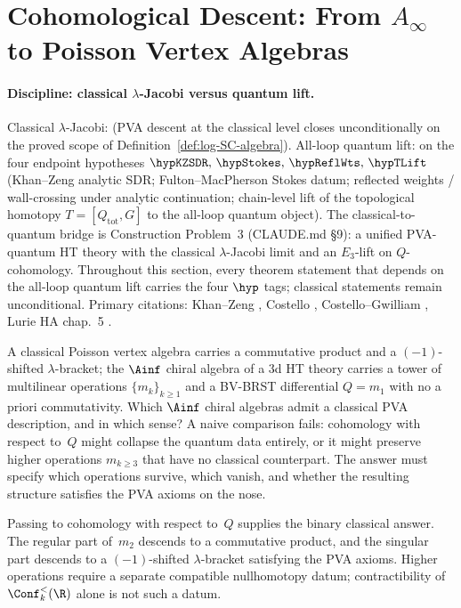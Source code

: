 \section{Cohomological Descent: From $A_\infty$ to Poisson Vertex Algebras}

\paragraph{Discipline: classical $\lambda$-Jacobi versus quantum lift.}
Classical $\lambda$-Jacobi: \ClaimStatusProvedHere{} (PVA descent at the
classical level closes unconditionally on the proved scope of
Definition~\ref{def:log-SC-algebra}). All-loop quantum lift:
\ClaimStatusConditional{} on the four endpoint hypotheses
$\hypKZSDR,\,\hypStokes,\,\hypReflWts,\,\hypTLift$
(Khan--Zeng analytic SDR; Fulton--MacPherson Stokes datum;
reflected weights / wall-crossing under analytic continuation;
chain-level lift of the topological homotopy
$T = [Q_{\mathrm{tot}}, G]$ to the all-loop quantum object).
The classical-to-quantum bridge is
Construction Problem~3 (CLAUDE.md \S9): a unified PVA-quantum HT theory
with the classical $\lambda$-Jacobi limit and an $E_3$-lift on
$Q$-cohomology. Throughout this section, every theorem statement that
depends on the all-loop quantum lift carries the four $\hyp$ tags;
classical statements remain unconditional. Primary citations:
Khan--Zeng \cite{KZ25}, Costello \cite{Costello2011Renorm},
Costello--Gwilliam \cite{CG17}, Lurie HA chap.~5 \cite{LurieHA}.

A classical Poisson vertex algebra carries a commutative product
and a $(-1)$-shifted $\lambda$-bracket; the $\Ainf$ chiral
algebra of a 3d HT theory carries a tower of multilinear
operations $\{m_k\}_{k \ge 1}$ and a BV-BRST differential
$Q = m_1$ with no a priori commutativity. Which $\Ainf$ chiral
algebras admit a classical PVA description, and in which sense?
A naive comparison fails: cohomology with respect to~$Q$ might
collapse the quantum data entirely, or it might preserve higher
operations $m_{k \ge 3}$ that have no classical counterpart.
The answer must specify which operations survive, which
vanish, and whether the resulting structure satisfies the PVA
axioms on the nose.

Passing to cohomology with respect to~$Q$ supplies the binary
classical answer. The regular part of~$m_2$ descends to a
commutative product, and the singular part descends to a
$(-1)$-shifted $\lambda$-bracket satisfying the PVA axioms.
Higher operations require a separate compatible nullhomotopy datum;
contractibility of $\Conf_k^{<}(\R)$ alone is not such a datum.

